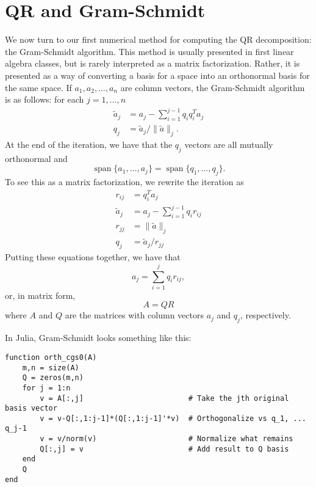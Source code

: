 \documentclass[12pt, leqno]{article} %
\begin{document}
\section{QR and Gram-Schmidt}

We now turn to our first numerical method for computing the
QR decomposition: the Gram-Schmidt algorithm.  This method is
usually presented in first linear algebra classes, but is
rarely interpreted as a matrix factorization.  Rather, it is
presented as a way of converting a basis for a space into an
orthonormal basis for the same space.  If $a_1, a_2, \ldots, a_n$
are column vectors, the Gram-Schmidt algorithm is as follows:
for each $j = 1, \ldots, n$
\begin{align*}
  \tilde{a}_j &= a_j - \sum_{i=1}^{j-1} q_i q_i^T a_j \\
  q_j &= \tilde{a}_j / \|\tilde{a}\|_j.
\end{align*}
At the end of the iteration, we have that the $q_j$ vectors are
all mutually orthonormal and
\[
  \operatorname{span}\{ a_1, \ldots, a_j \} =
  \operatorname{span}\{ q_1, \ldots, q_j \}.
\]
To see this as a matrix factorization, we rewrite the iteration as
\begin{align*}
  r_{ij} &= q_i^T a_j \\
  \tilde{a}_j &= a_j - \sum_{i=1}^{j-1} q_i r_{ij} \\
  r_{jj} &= \|\tilde{a}\|_j \\
  q_j &= \tilde{a}_j / r_{jj}
\end{align*}
Putting these equations together, we have that
\[
  a_j = \sum_{i=1}^j q_i r_{ij},
\]
or, in matrix form,
\[
  A = QR
\]
where $A$ and $Q$ are the matrices with column vectors $a_j$ and $q_j$,
respectively.

In Julia, Gram-Schmidt looks
something like this:
\begin{lstlisting}
function orth_cgs0(A)
    m,n = size(A)
    Q = zeros(m,n)
    for j = 1:n
        v = A[:,j]                        # Take the jth original basis vector
        v = v-Q[:,1:j-1]*(Q[:,1:j-1]'*v)  # Orthogonalize vs q_1, ... q_j-1
        v = v/norm(v)                     # Normalize what remains
        Q[:,j] = v                        # Add result to Q basis
    end
    Q
end
\end{lstlisting}
\end{document}
